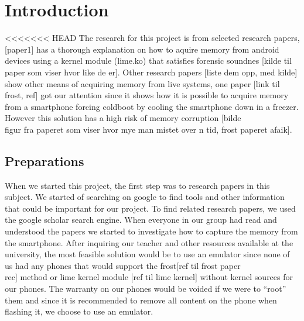 \section{Introduction}
<<<<<<< HEAD
The research for this project is from selected research papers, [paper1] has a
thorough explanation on how to aquire memory from android devices using a
kernel module (lime.ko) that satisfies forensic soundnes [kilde til paper som
viser hvor like de er]. Other research papers [liste dem opp, med kilde] show
other means of acquiring memory from live systems, one paper [link til frost,
ref] got our attention since it shows how it is possible to acquire memory from
a smartphone forcing coldboot by cooling the smartphone down in a freezer.
However this solution has a high risk of memory corruption [bilde\\figur fra
paperet som viser hvor mye man mistet over n tid, frost paperet afaik]. 


\subsection{Preparations}
When we started this project, the first step was to research papers in this
subject. We started of searching on google to find tools and other information
that could be important for our project. To find related research papers, we
used the google scholar search engine. When everyone in our group had read and
understood the papers we started to investigate how to capture the memory from
the smartphone. After inquiring our teacher and other resources available at
the university, the most feasible solution would be to use an emulator since
none of us had any phones that would support the frost[ref til frost paper\\rec]
method or lime kernel module [ref til lime kernel] without kernel sources for
our phones. The warranty on our phones would be voided if we were to “root”
them and since it is recommended to remove all content on the phone when
flashing it, we choose to use an emulator.


